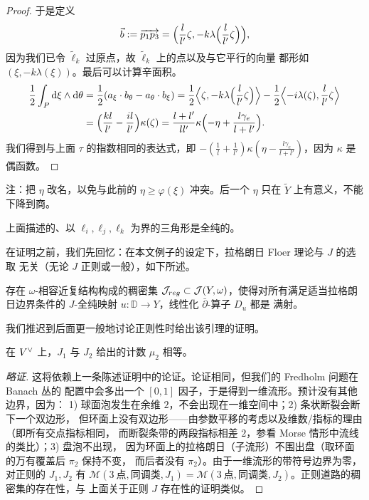 \begin{proof}
于是定义
\[
\vec b:=\overrightarrow{p_1p_3}
=\Bigl(\frac{l}{l'}\zeta,-k\lambda\Bigl(\frac{l}{l'}\zeta\Bigr)\Bigr),
\]
因为我们已令 $\tilde\ell_k$ 过原点，故 $\tilde\ell_k$ 上的点以及与它平行的向量
都形如 $(\xi,-k\lambda(\xi))$。最后可以计算辛面积。
\begin{align*}
\frac12\int_P\mathrm{d}\xi\wedge\mathrm{d}\theta
&=\frac12(a_\xi\cdot b_\theta-a_\theta\cdot b_\xi)
=\frac12\Bigl\langle\zeta,-k\lambda\Bigl(\frac{l}{l'}\zeta\Bigr)\Bigr\rangle
-\frac12\Bigl\langle -i\lambda(\zeta),\frac{l}{l'}\zeta\Bigr\rangle\\
&=\Bigl(\frac{kl}{l'}-\frac{il}{l'}\Bigr)\kappa(\zeta)
=\frac{l+l'}{ll'}\kappa\Bigl(-\eta+\frac{l\gamma_e}{l+l'}\Bigr).
\end{align*}
我们得到与上面 $\tau$ 的指数相同的表达式，即
$-(\frac1l+\frac1{l'})\kappa(\eta-\frac{l\gamma_e}{l+l'})$，因为 $\kappa$ 是
偶函数。
\end{proof}


注：把 $\eta$ 改名，以免与此前的 $\eta\ge\varphi(\xi)$ 冲突。后一个 $\eta$ 只在
$\widetilde Y$ 上有意义，不能下降到商。

\begin{claim}\label{claim:triangles-holomorphic}
上面描述的、以 $\ell_i,\ell_j,\ell_k$ 为界的三角形是全纯的。
\end{claim}

在证明之前，我们先回忆：在本文例子的设定下，拉格朗日 Floer 理论与 $J$ 的选取
无关（无论 $J$ 正则或一般），如下所述。

\begin{lemma}\label{lem:regular-j}
存在 $\omega$-相容近复结构构成的稠密集
$\mathcal{J}_{reg}\subset\mathcal{J}(Y,\omega)$，使得对所有满足适当拉格朗日边界条件的
$J$-全纯映射 $u\colon\mathbb{D}\to Y$，线性化 $\bar\partial$-算子 $D_u$ 都是
满射。
\end{lemma}

我们推迟到后面更一般地讨论正则性时给出该引理的证明。

\begin{lemma}\label{lem:independence-j}
在 $V^{\vee}$ 上，$J_1$ 与 $J_2$ 给出的计数 $\mu_2$ 相等。
\end{lemma}

\begin{proof}[略证]
这将依赖上一条陈述证明中的论证。论证相同，但我们的 Fredholm 问题在 Banach 丛的
配置中会多出一个 $[0,1]$ 因子，于是得到一维流形。预计没有其他边界，因为：
1) 球面泡发生在余维 $2$，不会出现在一维空间中；2) 条状断裂会断下一个双边形，
但环面上没有双边形——由参数平移的考虑以及维数/指标的理由（即所有交点指标相同，
而断裂条带的两段指标相差 $2$，参看 Morse 情形中流线的类比）；3) 盘泡不出现，
因为环面上的拉格朗日（子流形）不围出盘（取环面的万有覆盖后 $\pi_2$ 保持不变，
而后者没有 $\pi_2$）。由于一维流形的带符号边界为零，对正则的 $J_1,J_2$ 有
$\mathcal{M}(3\ \text{点},\text{同调类},J_1)
=\mathcal{M}(3\ \text{点},\text{同调类},J_2)$。正则道路的稠密集的存在性，与
上面关于正则 $J$ 存在性的证明类似。
\end{proof}

